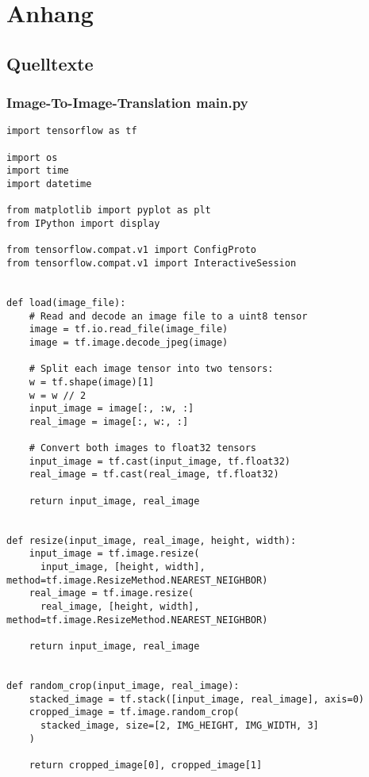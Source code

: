 \part*{Anhang}

\chapter{Quelltexte}
\label{ch:a_sim}

\section{Image-To-Image-Translation main.py}
\label{pix2pixpy}

\begin{lstlisting}
import tensorflow as tf

import os
import time
import datetime

from matplotlib import pyplot as plt
from IPython import display

from tensorflow.compat.v1 import ConfigProto
from tensorflow.compat.v1 import InteractiveSession


def load(image_file):
    # Read and decode an image file to a uint8 tensor
    image = tf.io.read_file(image_file)
    image = tf.image.decode_jpeg(image)

    # Split each image tensor into two tensors:
    w = tf.shape(image)[1]
    w = w // 2
    input_image = image[:, :w, :]
    real_image = image[:, w:, :]

    # Convert both images to float32 tensors
    input_image = tf.cast(input_image, tf.float32)
    real_image = tf.cast(real_image, tf.float32)

    return input_image, real_image


def resize(input_image, real_image, height, width):
    input_image = tf.image.resize(
      input_image, [height, width], method=tf.image.ResizeMethod.NEAREST_NEIGHBOR)
    real_image = tf.image.resize(
      real_image, [height, width], method=tf.image.ResizeMethod.NEAREST_NEIGHBOR)

    return input_image, real_image


def random_crop(input_image, real_image):
    stacked_image = tf.stack([input_image, real_image], axis=0)
    cropped_image = tf.image.random_crop(
      stacked_image, size=[2, IMG_HEIGHT, IMG_WIDTH, 3]
    )

    return cropped_image[0], cropped_image[1]
\end{lstlisting}
